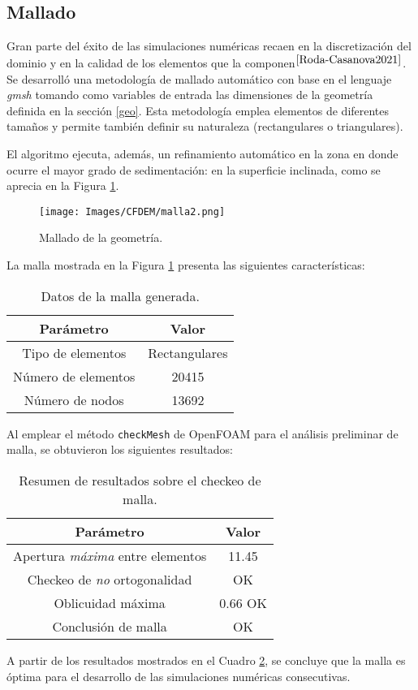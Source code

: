\subsection{Mallado}

\noindent
\justify

Gran parte del \'exito de las simulaciones num\'ericas recaen en la discretizaci\'on del dominio y en la calidad de los elementos que la componen$^{\cite{Roda-Casanova2021}}$. Se desarroll\'o una metodolog\'ia de mallado autom\'atico con base en el lenguaje \textit{gmsh} tomando como variables de entrada las dimensiones de la geometr\'ia definida en la secci\'on \ref{geo}. Esta metodolog\'ia emplea elementos de diferentes tama\~nos y permite tambi\'en definir su naturaleza (rectangulares o triangulares).

\noindent
\justify

El algoritmo ejecuta, adem\'as, un refinamiento autom\'atico en la zona en donde ocurre el mayor grado de sedimentaci\'on: en la superficie inclinada, como se aprecia en la Figura \ref{malla:geo}.

\begin{figure}[h!]
	\centering
	\texttt{[image: Images/CFDEM/malla2.png]}
	\caption{Mallado de la geometr\'ia.}
	\label{malla:geo}
\end{figure}

\newpage

\noindent
\justify

La malla mostrada en la Figura \ref{malla:geo} presenta las siguientes caracter\'isticas:

\begin{table}[h!]
	\centering
	\begin{tabular}{|c|c|}
		\hline
		\textbf{Par\'ametro} & \textbf{Valor} \\ \hline
		Tipo de elementos & Rectangulares \\ \hline
		N\'umero de elementos & 20415 \\ \hline
		N\'umero de nodos & 13692 \\ \hline	
	\end{tabular}
	\caption{Datos de la malla generada.}
	\label{malla}
\end{table}

\noindent
\justify

Al emplear el m\'etodo \texttt{checkMesh} de OpenFOAM para el an\'alisis preliminar de malla, se obtuvieron los siguientes resultados:

\begin{table}[h!]
	\centering
	\begin{tabular}{|c|c|}
		\hline
		\textbf{Par\'ametro} & \textbf{Valor} \\ \hline
		Apertura \textit{m\'axima} entre elementos & 11.45 \\ \hline
		Checkeo de \textit{no} ortogonalidad & OK \\ \hline
		Oblicuidad m\'axima & 0.66 OK \\ \hline
		Conclusi\'on de malla & OK \\ \hline
	\end{tabular}
	\caption{Resumen de resultados sobre el checkeo de malla.}
	\label{check}
\end{table}

\noindent
\justify

A partir de los resultados mostrados en el Cuadro \ref{check}, se concluye que la malla es \'optima para el desarrollo de las simulaciones num\'ericas consecutivas.